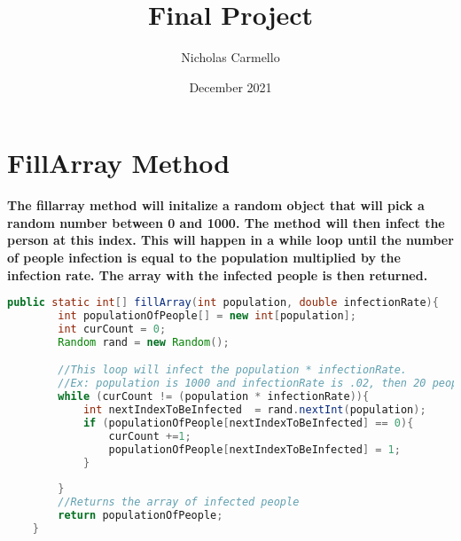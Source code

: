 \documentclass{article}
\begin{document}
\title{Final Project}
\author{Nicholas Carmello}
\date{December 2021}
\section{FillArray Method}
\textbf{
The fillarray method will initalize a random object that will pick a random number between 0 and 1000. The method will then infect the person at this index. This will happen in a while loop until the number of people infection is equal to the population multiplied by the infection rate. The array with the infected people is then returned.
}
\begin{lstlisting}[language = java]
public static int[] fillArray(int population, double infectionRate){
        int populationOfPeople[] = new int[population];
        int curCount = 0;
        Random rand = new Random();

        //This loop will infect the population * infectionRate.
        //Ex: population is 1000 and infectionRate is .02, then 20 people will be infected.
        while (curCount != (population * infectionRate)){
            int nextIndexToBeInfected  = rand.nextInt(population);
            if (populationOfPeople[nextIndexToBeInfected] == 0){
                curCount +=1;
                populationOfPeople[nextIndexToBeInfected] = 1;
            }
            
        }
        //Returns the array of infected people
        return populationOfPeople;
    }
\end{lstlisting}
\end{document}
